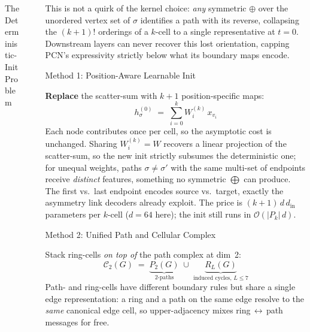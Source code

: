 \documentclass[final]{beamer}
\newlength{\sepwidth}
\newlength{\colwidth}
\newcommand{\separatorcolumn}{
  \begin{column}{\sepwidth}
\end{column}}
\begin{document}
\begin{frame}[t]
\begin{columns}[t]
\begin{column}{\colwidth}
\begin{block}{The Deterministic-Init Problem}
      \end{block}

    \end{column}

    \separatorcolumn

    \begin{column}{\colwidth}

      This is not a quirk of the kernel choice: \emph{any} symmetric
      $\oplus$ over the unordered vertex set of $\sigma$ identifies a
      path with its reverse, collapsing the $(k{+}1)!$ orderings of a
      $k$-cell to a single representative at $t{=}0$. Downstream
      layers can never recover this lost orientation, capping PCN's
      expressivity strictly below what its boundary maps encode.

      \medskip

      \begin{block}{Method 1: Position-Aware Learnable Init}

        \textbf{Replace} the scatter-sum with $k{+}1$ position-specific maps:
        \[
          \boxed{\;
            h_\sigma^{(0)} \;=\; \sum_{i=0}^{k} W_i^{(k)}\,x_{v_i}
          \;}
        \]
        Each node contributes once per cell, so the asymptotic cost is
        unchanged. Sharing $W_i^{(k)}=W$ recovers a linear projection
        of the scatter-sum, so the new init strictly subsumes the
        deterministic one; for unequal weights, paths $\sigma\neq\sigma'$
        with the same multi-set of endpoints receive \emph{distinct}
        features, something no symmetric $\bigoplus$ can produce. The
        first vs.\ last endpoint encodes source vs.\ target, exactly
        the asymmetry link decoders already exploit. The price is
        $(k{+}1)\,d\,d_{\!\textrm{in}}$ parameters per $k$-cell ($d{=}64$
        here); the init still runs in $\mathcal O(|P_k|\,d)$.

      \end{block}

      \medskip

      \begin{block}{Method 2: Unified Path and Cellular Complex}

        Stack ring-cells \emph{on top of} the path complex at dim~2:
        \[
          \mathcal C_2(G)\;=\;\underbrace{P_2(G)}_{\text{2-paths}}\;\cup\;
          \underbrace{R_L(G)}_{\text{induced cycles},\,L\leq 7}
        \]
        Path- and ring-cells have different boundary rules but share a
        single edge representation: a ring and a path on the same edge
        resolve to the \emph{same} canonical edge cell, so
        upper-adjacency mixes ring\,$\leftrightarrow$\,path messages
        for free.


\end{block}
\end{column}
\end{columns}
\end{frame}
\end{document}
